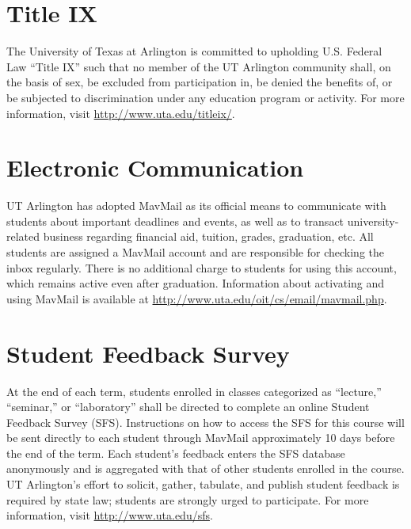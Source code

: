 \documentclass[10pt]{article}
\begin{document}
\section*{Title IX}
\label{sec:orgheadline13}
The University of Texas at Arlington is committed to upholding U.S. Federal Law “Title IX” such that no
member of the UT Arlington community shall, on the basis of sex, be excluded from participation in, be denied the
benefits of, or be subjected to discrimination under any education program or activity. For more information, visit \href{http://www.uta.edu/titleix/}{\url{http://www.uta.edu/titleix/}}.
\section*{Electronic Communication}
\label{sec:orgheadline14}
UT Arlington has adopted MavMail as its official means to communicate with
students about important deadlines and events, as well as to transact university-related business regarding
financial aid, tuition, grades, graduation, etc. All students are assigned a MavMail account and are responsible
for checking the inbox regularly. There is no additional charge to students for using this account, which
remains active even after graduation. Information about activating and using MavMail is available at
\url{http://www.uta.edu/oit/cs/email/mavmail.php}.
\section*{Student Feedback Survey}
\label{sec:orgheadline15}
At the end of each term, students enrolled in classes categorized as “lecture,”
“seminar,” or “laboratory” shall be directed to complete an online Student Feedback Survey (SFS).
Instructions on how to access the SFS for this course will be sent directly to each student through MavMail
approximately 10 days before the end of the term. Each student’s feedback enters the SFS database
anonymously and is aggregated with that of other students enrolled in the course. UT Arlington’s effort to
solicit, gather, tabulate, and publish student feedback is required by state law; students are strongly urged to
participate. For more information, visit \url{http://www.uta.edu/sfs}.
\end{document}
